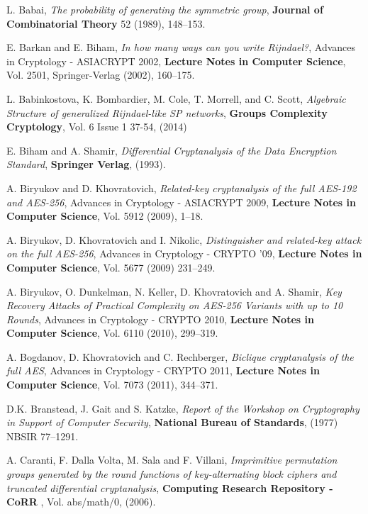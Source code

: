 \documentclass[11pt]{amsart}
\begin{document}
\begin{thebibliography}{9}

 L. Babai, \emph {The probability of generating the symmetric group}, {\bf Journal of Combinatorial Theory} 52 (1989), 148--153.

 E. Barkan and E. Biham, \emph {In how many ways can you write Rijndael?}, Advances in Cryptology - ASIACRYPT 2002,  {\bf Lecture Notes in Computer Science}, Vol. 2501,  Springer-Verlag (2002), 160--175.

 {L. Babinkostova, K. Bombardier, M. Cole, T. Morrell, and C. Scott, \emph{ Algebraic Structure of generalized Rijndael-like SP networks}, {\bf Groups Complexity Cryptology}, Vol. 6 Issue 1 37-54, (2014) }

 E. Biham and A. Shamir, \emph {Differential Cryptanalysis of the Data Encryption Standard},  {\bf Springer Verlag}, (1993).

 A. Biryukov and D. Khovratovich, \emph {Related-key cryptanalysis of the full AES-192 and AES-256},  Advances in Cryptology - ASIACRYPT 2009, {\bf Lecture Notes in Computer Science}, Vol. 5912 (2009), 1--18. 

  A. Biryukov, D. Khovratovich and I. Nikolic, \emph{ Distinguisher and related-key attack on the full AES-256}, Advances in Cryptology - CRYPTO '09, {\bf Lecture Notes in Computer Science}, Vol. 5677 (2009) 231--249. 

 A. Biryukov, O. Dunkelman, N. Keller, D. Khovratovich and A. Shamir, \emph {Key Recovery Attacks of Practical Complexity on AES-256 Variants with up to 10 Rounds}, Advances in Cryptology - CRYPTO 2010, {\bf Lecture Notes in Computer Science}, Vol. 6110 (2010),  299--319.

 A. Bogdanov, D. Khovratovich and C. Rechberger, \emph {Biclique cryptanalysis of the full AES},  Advances in Cryptology - CRYPTO 2011,  {\bf Lecture Notes in Computer Science}, Vol. 7073 (2011),  344--371.

 D.K. Branstead, J. Gait and S. Katzke,  \emph {Report of the Workshop on Cryptography in Support of Computer Security}, {\bf National Bureau of Standards}, (1977)  NBSIR 77--1291.

 A. Caranti, F. Dalla Volta, M. Sala and F. Villani, \emph {Imprimitive permutation groups generated by the round functions of key-alternating block ciphers and truncated differential cryptanalysis}, {\bf Computing Research Repository - CoRR} , Vol. abs/math/0, (2006).


\end{thebibliography}
\end{document}
